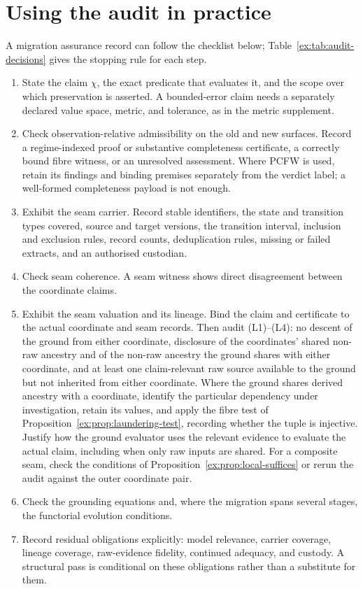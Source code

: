 \documentclass[twocolumn,envcountsect,envcountsame,natbib]{svjour3}
\begin{document}
\section{Using the audit in practice}\label{ex:sec:practice}
A migration assurance record can follow the checklist below; Table~\ref{ex:tab:audit-decisions} gives the stopping rule for each step.
\begin{enumerate}
\item State the claim $\chi$, the exact predicate that evaluates it, and the scope over which preservation is asserted. A bounded-error claim needs a separately declared value space, metric, and tolerance, as in the metric supplement.
\item Check observation-relative admissibility on the old and new surfaces. Record a regime-indexed proof or substantive completeness certificate, a correctly bound fibre witness, or an unresolved assessment. Where PCFW is used, retain its findings and binding premises separately from the verdict label; a well-formed completeness payload is not enough.
\item Exhibit the seam carrier. Record stable identifiers, the state and transition types covered, source and target versions, the transition interval, inclusion and exclusion rules, record counts, deduplication rules, missing or failed extracts, and an authorised custodian.
\item Check seam coherence. A seam witness shows direct disagreement between the coordinate claims.
\item Exhibit the seam valuation and its lineage. Bind the claim and certificate to the actual coordinate and seam records. Then audit (L1)--(L4): no descent of the ground from either coordinate, disclosure of the coordinates' shared non-raw ancestry and of the non-raw ancestry the ground shares with either coordinate, and at least one claim-relevant raw source available to the ground but not inherited from either coordinate. Where the ground shares derived ancestry with a coordinate, identify the particular dependency under investigation, retain its values, and apply the fibre test of Proposition~\ref{ex:prop:laundering-test}, recording whether the tuple is injective. Justify how the ground evaluator uses the relevant evidence to evaluate the actual claim, including when only raw inputs are shared. For a composite seam, check the conditions of Proposition~\ref{ex:prop:local-suffices} or rerun the audit against the outer coordinate pair.
\item Check the grounding equations and, where the migration spans several stages, the functorial evolution conditions.
\item Record residual obligations explicitly: model relevance, carrier coverage, lineage coverage, raw-evidence fidelity, continued adequacy, and custody. A structural pass is conditional on these obligations rather than a substitute for them.
\end{enumerate}
\end{document}
